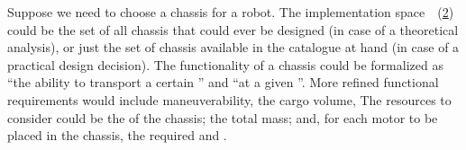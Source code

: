 \begin{figure}[h!]
    \centering
    \caption{}
    \label{fig:motor_evalexec}
\end{figure}

\begin{example}
    \label{exa:chassis}
    Suppose we need to choose a chassis for a robot.
    The implementation space~\impsp~(\cref{fig:gmcdp_chassis_eval}) could be the set of all chassis that could ever be designed (in case of a theoretical analysis), or just the set of chassis available in the catalogue at hand (in case of a practical design decision).
    The functionality of a chassis could be formalized as ``the ability to transport a certain '' and ``at a given ''.
    More refined functional requirements would include maneuverability, the cargo volume, \etc
    The resources to consider could be the  of the chassis; the total mass;
    and, for each motor to be placed in the chassis, the required  and .
\end{example}

\begin{figure}[h!]
    \centering
    \caption{}
    \label{fig:gmcdp_chassis_eval}
\end{figure}


